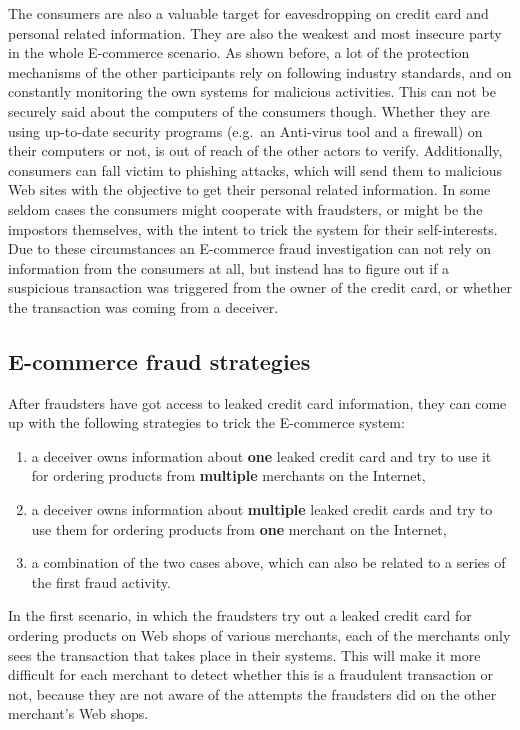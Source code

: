 The consumers are also a valuable target for eavesdropping on credit card and personal related information. They are also the weakest and most insecure party in the whole \gls{E-commerce} scenario. As shown before, a lot of the protection mechanisms of the other participants rely on following industry standards, and on constantly monitoring the own systems for malicious activities. This can not be securely said about the computers of the consumers though. Whether they are using up-to-date security programs (e.g.\ an Anti-virus tool and a firewall) on their computers or not, is out of reach of the other actors to verify. Additionally, consumers can fall victim to phishing attacks, which will send them to malicious Web sites with the objective to get their personal related information. In some seldom cases the consumers might cooperate with fraudsters, or might be the impostors themselves, with the intent to trick the system for their self-interests. Due to these circumstances an \gls{E-commerce} fraud investigation can not rely on information from the consumers at all, but instead has to figure out if a suspicious transaction was triggered from the owner of the credit card, or whether the transaction was coming from a deceiver.


\subsection{\Gls{E-commerce} fraud strategies}
\label{subsec:strategies_fraudster}

After fraudsters have got access to leaked credit card information, they can come up with the following strategies to trick the \gls{E-commerce} system:\@

\begin{enumerate}
  \item a deceiver owns information about \textbf{one} leaked credit card and try to use it for ordering products from \textbf{multiple} merchants on the Internet,
  \item a deceiver owns information about \textbf{multiple} leaked credit cards and try to use them for ordering products from \textbf{one} merchant on the Internet,
  \item a combination of the two cases above, which can also be related to a series of the first fraud activity.
\end{enumerate}

In the first scenario, in which the fraudsters try out a leaked credit card for ordering products on Web shops of various merchants, each of the merchants only sees the transaction that takes place in their systems. This will make it more difficult for each merchant to detect whether this is a fraudulent transaction or not, because they are not aware of the attempts the fraudsters did on the other merchant's Web shops. \\

